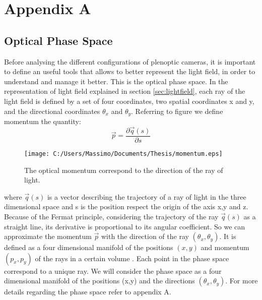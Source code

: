 \chapter*{Appendix A}
\section{Optical Phase Space}
Before analysing the different configurations of plenoptic cameras, it is important to define an useful tools that allows to better represent the light field, in order to understand and manage it better. This is the optical phase space. In the representation of light field explained in section \ref{sec:lightfield}, each ray of the light field is defined by a set of four coordinates, two spatial coordinates x and y, and the directional coordinates $\theta_x$ and $\theta_y$. Referring to figure we define momentum the quantity:
\begin{equation}
\label{eq:momentum}
\overrightarrow{p} =\dfrac{\partial \overrightarrow{q}(s)}{\partial s} 
\end{equation}
\begin{figure}[H]
	\centering
	\texttt{[image: C:/Users/Massimo/Documents/Thesis/momentum.eps]}
	\caption{\label{fig:momentum}The optical momentum correspond to the direction of the ray of light.}
\end{figure}
where $\overrightarrow{q}(s)$ is a vector describing the trajectory of a ray of light in the three dimensional space and s is the position respect the origin of the axis x,y and z. Because of the Fermat principle, considering the trajectory of the ray  $\overrightarrow{q}(s)$ as a straight line, its derivative is proportional to its angular coefficient. So we can approximate the momentum $\overrightarrow{p}$ with the direction of the ray $(\theta_x,\theta_y)$.
It is defined as a four dimensional manifold of the positions $(x,y)$ and  momentum $(p_x,p_y)$ of the rays in a certain volume \cite{wolf2004geometric} \cite{guillemin1990symplectic}. Each point in the phase space correspond to a unique ray. We will consider the phase space as a four dimensional manifold of the positions (x,y) and the directions $(\theta_x,\theta_y)$. For more details regarding the phase space refer to appendix A. 


